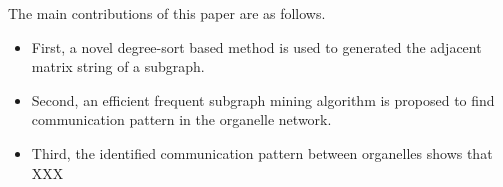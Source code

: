 \documentclass[9pt,oneside]{article}
\begin{document}
The main contributions of this paper are as follows.
\begin{itemize}
  \item First, a novel degree-sort based method is used to generated the adjacent matrix string of a subgraph. %
  \item Second, an efficient frequent subgraph mining algorithm is proposed to find communication pattern in the organelle network. %
  \item Third, the identified communication pattern between organelles shows that  XXX
\end{itemize}




\end{document}
